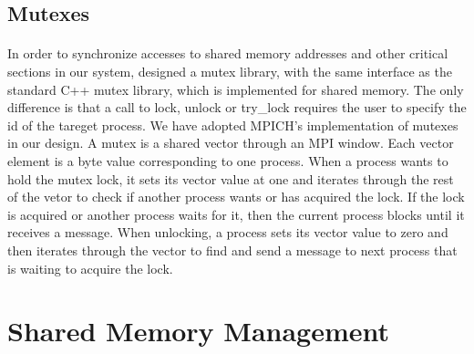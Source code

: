 \subsection{Mutexes}
\paragraph{}
In order to synchronize accesses to shared memory addresses and other critical sections in our system, designed
a mutex library, with the same interface as the standard C++ mutex library, which is implemented
for shared memory.  The only difference is that a call to lock, unlock or try\_lock requires the user to specify
the id of the tareget process. We have adopted MPICH's implementation of mutexes in our design.  A mutex is a
shared vector through an MPI window.  Each vector element is a byte value corresponding to one process.  When
a process wants to hold the mutex lock, it sets its vector value at one and iterates through the rest of the 
vetor to check if another process wants or has acquired the lock.  If the lock is acquired or another process 
waits for it, then the current process blocks until it receives a message.  When unlocking, a process sets its 
vector value to zero and then iterates through the vector to find and send a message to next process that is 
waiting to acquire the lock.  

\section{Shared Memory Management}
\label{sect:shared-memory-manager}

